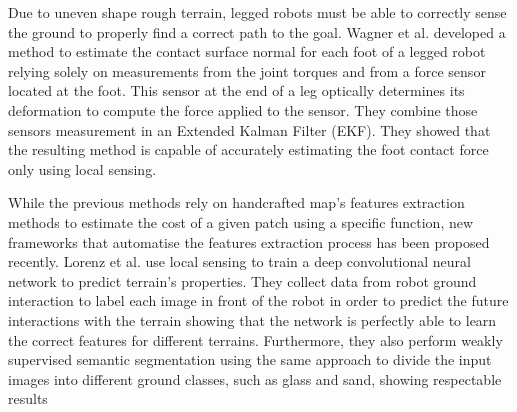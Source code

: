 \documentclass[../document.tex]{subfiles}
\begin{document}
Due to uneven shape rough terrain, legged robots must be able to correctly sense the ground to properly find a correct path to the goal. Wagner et al. \cite{wagner2016foot} developed a method to estimate the contact surface normal for each foot of a legged robot relying solely on measurements from the joint torques and from a force sensor located at the foot. This sensor at the end of a leg optically determines its deformation to compute the force applied to the sensor. They combine those sensors measurement in an Extended Kalman Filter (EKF). They showed that the resulting method is capable of accurately estimating the foot contact force only using local sensing.

While the previous methods rely on handcrafted map's features extraction methods to estimate the cost of a given patch using a specific function, new frameworks that automatise the features extraction process has been proposed recently. Lorenz et al. \cite{wellhausen2019where} use local sensing to train a deep convolutional neural network to predict terrain's properties. They collect data from robot ground interaction to label each image in front of the robot in order to predict the future interactions with the terrain showing that the network is perfectly able to learn the correct features for different terrains.
Furthermore, they also perform weakly supervised semantic segmentation using the same approach to divide the input images into different ground classes, such as glass and sand, showing respectable results 

\end{document}

